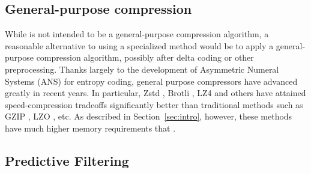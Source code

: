 
\subsection{General-purpose compression}
While \minesp is not intended to be a general-purpose compression algorithm, a reasonable alternative to using a specialized method would be to apply a general-purpose compression algorithm, possibly after delta coding or other preprocessing. Thanks largely to the development of Asymmetric Numeral Systems (ANS) \cite{ans} for entropy coding, general purpose compressors have advanced greatly in recent years. In particular, Zstd \cite{zstd}, Brotli \cite{brotli}, LZ4 \cite{lz4} and others have attained speed-compression tradeoffs significantly better than traditional methods such as GZIP \cite{gzip}, LZO \cite{lzo}, etc. As described in Section~\ref{sec:intro}, however, these methods have much higher memory requirements that \mine.


\subsection{Predictive Filtering}



